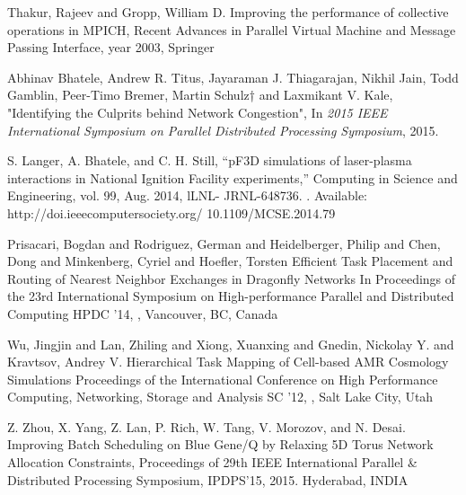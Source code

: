 \documentclass[conference]{IEEEtran}
\begin{document}
\begin{thebibliography}{10}
Thakur, Rajeev and Gropp, William D.
\newblock Improving the performance of collective operations in MPICH,
\newblock Recent Advances in Parallel Virtual Machine and Message Passing Interface,
\newblock year 2003,
\newblock Springer

Abhinav Bhatele, Andrew R. Titus, Jayaraman J. Thiagarajan, Nikhil Jain, Todd Gamblin,
Peer-Timo Bremer, Martin Schulz† and Laxmikant V. Kale,
\newblock "Identifying the Culprits behind Network Congestion",
\newblock In {\em 2015 IEEE International Symposium on Parallel Distributed Processing Symposium}, 2015.

S. Langer, A. Bhatele, and C. H. Still,
\newblock “pF3D simulations of laser-plasma interactions in National Ignition Facility experiments,” 
\newblock Computing in Science and Engineering, vol. 99, Aug. 2014, lLNL- JRNL-648736. 
\newblock [Online]. Available: http://doi.ieeecomputersociety.org/ 10.1109/MCSE.2014.79

%

Prisacari, Bogdan and Rodriguez, German and Heidelberger, Philip and Chen, Dong and Minkenberg, Cyriel and Hoefler, Torsten
\newblock Efficient Task Placement and Routing of Nearest Neighbor Exchanges in Dragonfly Networks
\newblock In Proceedings of the 23rd International Symposium on High-performance Parallel and Distributed Computing
\newblock HPDC '14,
,
\newblock Vancouver, BC, Canada

Wu, Jingjin and Lan, Zhiling and Xiong, Xuanxing and Gnedin, Nickolay Y. and Kravtsov, Andrey V.
\newblock Hierarchical Task Mapping of Cell-based AMR Cosmology Simulations
\newblock Proceedings of the International Conference on High Performance Computing, Networking, Storage and Analysis
\newblock SC '12,
,
\newblock Salt Lake City, Utah

Z. Zhou, X. Yang, Z. Lan, P. Rich, W. Tang, V. Morozov, and N. Desai.
\newblock Improving Batch Scheduling on Blue Gene/Q by Relaxing 5D Torus Network Allocation Constraints,
\newblock Proceedings of 29th IEEE International Parallel \& Distributed Processing 
Symposium,
\newblock IPDPS'15, 2015.
\newblock Hyderabad, INDIA


\end{thebibliography}
\end{document}
